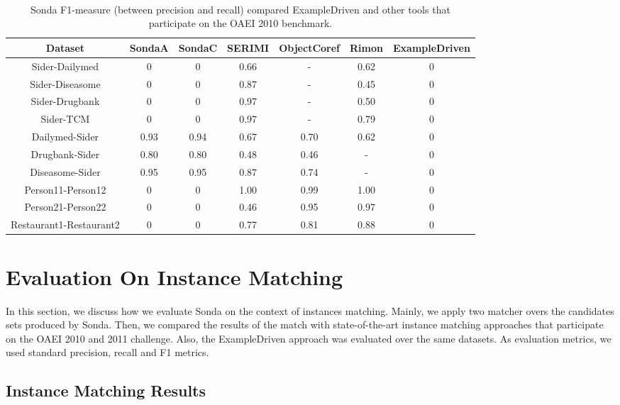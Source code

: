 \begin{center}
\begin{table*}[h]
\centering
\scriptsize\tt
\caption{Sonda  F1-measure (between precision and recall) compared ExampleDriven and  other tools that participate on the OAEI 2010 benchmark.} 
\begin{tabular}{|c|c|c|c|c|c|c|}
\hline
Dataset &  SondaA &  SondaC & SERIMI & ObjectCoref & Rimon & ExampleDriven \\ \hline
Sider-Dailymed & 0 & 0   & 0.66 & - & 0.62  & 0\\ \hline
Sider-Diseasome & 0& 0   & 0.87 & - & 0.45 & 0\\ \hline
Sider-Drugbank & 0 & 0  & 0.97 & - & 0.50  & 0\\ \hline
Sider-TCM & 0 & 0  & 0.97 & - & 0.79 &  0\\ \hline
Dailymed-Sider & 0.93  & 0.94 & 0.67 & 0.70 & 0.62  & 0\\ \hline
Drugbank-Sider & 0.80  & 0.80 & 0.48 & 0.46 & -  & 0\\ \hline
Diseasome-Sider & 0.95 & 0.95   & 0.87 & 0.74 & -  & 0\\ \hline
Person11-Person12 & 0 & 0  & 1.00 & 0.99 & 1.00  & 0\\ \hline
Person21-Person22 & 0 & 0  & 0.46 & 0.95 & 0.97 & 0\\ \hline
Restaurant1-Restaurant2 & 0 & 0  & 0.77 & 0.81  & 0.88 & 0\\ \hline
 								 									 
\end{tabular}  
\end{table*} 
\end{center}



\section{Evaluation On Instance Matching}
In this section, we discuss how we evaluate Sonda on the context of instances matching.  Mainly, we apply two matcher overs the candidates sets produced by Sonda. Then, we compared the results of the match with state-of-the-art instance matching approaches that participate on the OAEI 2010 and 2011 challenge. Also, the ExampleDriven approach was evaluated over the same datasets. As evaluation metrics, we used standard precision, recall and F1 metrics. 

\subsection{Instance Matching Results} 

